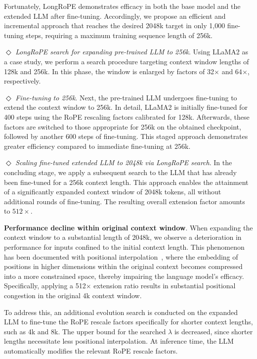 Fortunately, LongRoPE demonstrates efficacy in both the base model and the extended LLM after fine-tuning. Accordingly, we propose an efficient and incremental approach that reaches the desired 2048k target in only 1,000 fine-tuning steps, requiring a maximum training sequence length of 256k.

$\Diamond$ \textit{LongRoPE search for expanding pre-trained LLM to 256k}. Using LLaMA2 as a case study, we perform a search procedure targeting context window lengths of 128k and 256k. In this phase, the window is enlarged by factors of 32$\times$ and 64$\times$, respectively.

$\Diamond$ \textit{Fine-tuning to 256k}. Next, the pre-trained LLM undergoes fine-tuning to extend the context window to 256k. In detail, LLaMA2 is initially fine-tuned for 400 steps using the RoPE rescaling factors calibrated for 128k. Afterwards, these factors are switched to those appropriate for 256k on the obtained checkpoint, followed by another 600 steps of fine-tuning. This staged approach demonstrates greater efficiency compared to immediate fine-tuning at 256k.

$\Diamond$ \textit{Scaling fine-tuned extended LLM to 2048k via LongRoPE search}. In the concluding stage, we apply a subsequent search to the LLM that has already been fine-tuned for a 256k context length. This approach enables the attainment of a significantly expanded context window of 2048k tokens, all without additional rounds of fine-tuning. The resulting overall extension factor amounts to $512\times$.

\textbf{Performance decline within original context window}. When expanding the context window to a substantial length of 2048k, we observe a deterioration in performance for inputs confined to the initial context length. This phenomenon has been documented with positional interpolation~\cite{pi}, where the embedding of positions in higher dimensions within the original context becomes compressed into a more constrained space, thereby impairing the language model's efficacy. Specifically, applying a 512$\times$ extension ratio results in substantial positional congestion in the original 4k context window.

To address this, an additional evolution search is conducted on the expanded LLM to fine-tune the RoPE rescale factors specifically for shorter context lengths, such as 4k and 8k. The upper bound for the searched $\lambda$ is decreased, since shorter lengths necessitate less positional interpolation. At inference time, the LLM automatically modifies the relevant RoPE rescale factors.


